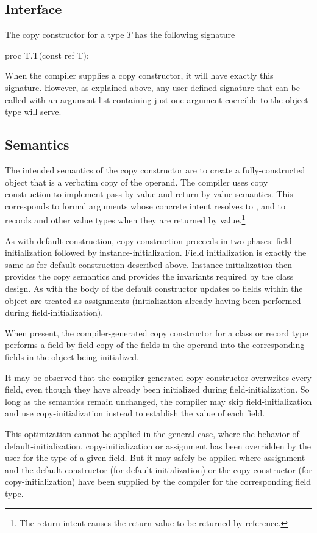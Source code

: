 \subsection{Interface}

The copy constructor for a type $T$ has the following signature
\begin{chapel}
proc T.T(const ref T);
\end{chapel}
When the compiler supplies a copy constructor, it will have exactly this
signature.  However, as explained above, any user-defined signature that can be
called with an argument list containing just one argument coercible to the
object type will serve.

\subsection{Semantics}

The intended semantics of the copy constructor are to create a fully-constructed
object that is a verbatim copy of the operand.  The compiler uses copy
construction to implement pass-by-value and return-by-value semantics.  This
corresponds to formal arguments whose concrete intent resolves to , and
to records and other value types when they are returned by value.\footnote{The
return intent  causes the return value to be returned by reference.}

As with default construction, copy construction proceeds in two phases:
field-initialization followed by instance-initialization.  Field initialization
is exactly the same as for default construction described above.  Instance
initialization then provides the copy semantics and provides the invariants
required by the class design.  As with the body of the default constructor
updates to fields within the object are treated as assignments (initialization
already having been performed during field-initialization).

When present, the compiler-generated copy constructor for a class or record type
performs a field-by-field copy of the fields in the operand into the
corresponding fields in the object being initialized.  

\begin{note}
It may be observed that the compiler-generated copy constructor overwrites every
field, even though they have already been initialized during
field-initialization.  So long as the semantics remain unchanged, the compiler
may skip field-initialization and use copy-initialization instead to establish
the value of each field.

This optimization cannot be applied in the general case, where the behavior of
default-initialization, copy-initialization or assignment has been overridden by
the user for the type of a given field.  But it may safely be applied where
assignment and the default constructor (for default-initialization) or the copy
constructor (for copy-initialization) have been supplied by the compiler for the
corresponding field type.
\end{note}

